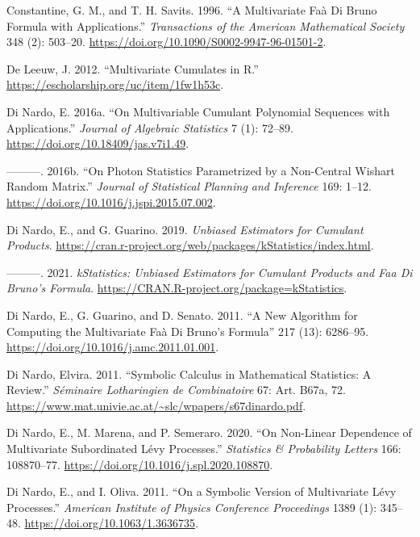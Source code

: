\begin{CSLReferences}{1}{0}
\leavevmode{}%
Constantine, G. M., and T. H. Savits. 1996. {``A Multivariate {F}aà Di {B}runo Formula with Applications.''} \emph{Transactions of the American Mathematical Society} 348 (2): 503--20. \url{https://doi.org/10.1090/S0002-9947-96-01501-2}.

\leavevmode{}%
De Leeuw, J. 2012. {``Multivariate {C}umulates in {R}.''} \url{https://escholarship.org/uc/item/1fw1h53c}.

\leavevmode{}%
Di Nardo, E. 2016a. {``On Multivariable Cumulant Polynomial Sequences with Applications.''} \emph{Journal of Algebraic Statistics} 7 (1): 72--89. \url{https://doi.org/10.18409/jas.v7i1.49}.

\leavevmode{}%
---------. 2016b. {``On Photon Statistics Parametrized by a Non-Central {W}ishart Random Matrix.''} \emph{Journal of Statistical Planning and Inference} 169: 1--12. \url{https://doi.org/10.1016/j.jspi.2015.07.002}.

\leavevmode{}%
Di Nardo, E., and G. Guarino. 2019. \emph{Unbiased Estimators for Cumulant Products}. \url{https://cran.r-project.org/web/packages/kStatistics/index.html}.

\leavevmode{}%
---------. 2021. \emph{kStatistics: Unbiased Estimators for Cumulant Products and Faa Di Bruno's Formula}. \url{https://CRAN.R-project.org/package=kStatistics}.

\leavevmode{}%
Di Nardo, E., G. Guarino, and D. Senato. 2011. {``A New Algorithm for Computing the Multivariate {F}aà Di {B}runo's Formula''} 217 (13): 6286--95. \url{https://doi.org/10.1016/j.amc.2011.01.001}.

\leavevmode{}%
Di Nardo, Elvira. 2011. {``Symbolic Calculus in Mathematical Statistics: A Review.''} \emph{Séminaire Lotharingien de Combinatoire} 67: Art. B67a, 72. \url{https://www.mat.univie.ac.at/~slc/wpapers/s67dinardo.pdf}.

\leavevmode{}%
Di Nardo, E., M. Marena, and P. Semeraro. 2020. {``On Non-Linear Dependence of Multivariate Subordinated {L}évy Processes.''} \emph{Statistics \& Probability Letters} 166: 108870--77. \url{https://doi.org/10.1016/j.spl.2020.108870}.

\leavevmode{}%
Di Nardo, E., and I. Oliva. 2011. {``On a Symbolic Version of Multivariate Lévy Processes.''} \emph{American Institute of Physics Conference Proceedings} 1389 (1): 345--48. \url{https://doi.org/10.1063/1.3636735}.


\end{CSLReferences}
